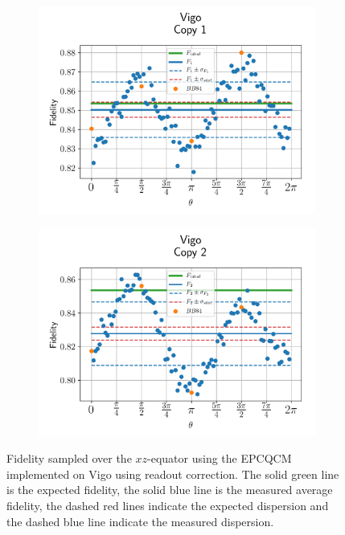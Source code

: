 \begin{figure}[H]
  \centering
  \begin{subfigure}{.5\textwidth}
    \centering
    \includegraphics[width=\textwidth]{Figures/Economical/IBM/OnlyEquator/results_corrected_vigo_copy1.png}
    \label{fig:epc_corrected_vigo_equator_1}
  \end{subfigure}%
  \begin{subfigure}{.5\textwidth}
    \centering
    \includegraphics[width=\textwidth]{Figures/Economical/IBM/OnlyEquator/results_corrected_vigo_copy2.png}
    \label{fig:epc_corrected_vigo_equator_2}
  \end{subfigure}
  \vspace{-0.5cm}
  \caption{Fidelity sampled over the $xz$-equator using the EPCQCM implemented on Vigo using readout correction. The solid green line is the expected fidelity, the solid blue line is the measured average fidelity, the dashed red lines indicate the expected dispersion and the dashed blue line indicate the measured dispersion.}
  \label{fig:epc_corrected_vigo_equator}
\end{figure}

